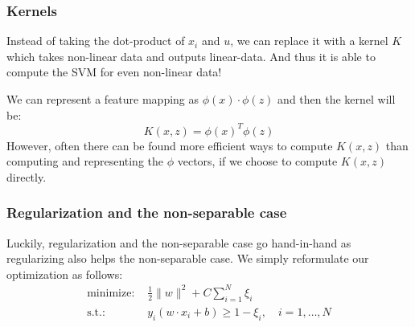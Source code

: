     \subsubsection{Kernels}
    Instead of taking the dot-product of $x_i$ and $u$, we can replace it with 
    a kernel $K$ which takes non-linear data and outputs linear-data. And thus 
    it is able to compute the SVM for even non-linear data!
    
    We can represent a feature mapping as $\phi(x) \cdot \phi(z)$ and then the 
    kernel will be:
    \begin{equation*}
        K(x,z) = \phi(x)^T\phi(z)
    \end{equation*}
    However, often there can be found more efficient ways to compute $K(x,z)$ 
    than computing and representing the $\phi$ vectors, if we choose to compute 
    $K(x,z)$ directly.
    
    \subsubsection{Regularization and the non-separable case}
    Luckily, regularization and the non-separable case go hand-in-hand as 
    regularizing also helps the non-separable case. We simply reformulate our 
    optimization as follows:
    \begin{align*}
        \text{minimize: }&\frac{1}{2}\|w\|^2 + C \sum_{i=1}^{N}\xi_i\\
        \text{s.t.: }&y_i(w \cdot x_i + b) \geq 1-\xi_i, \quad i=1,\dots,N
    \end{align*}
    
    
